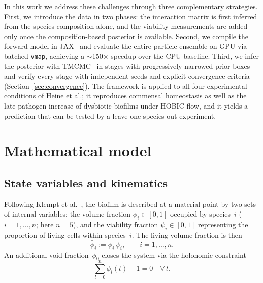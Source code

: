 \documentclass[11pt,a4paper]{article}
\begin{document}
In this work we address these challenges through three complementary strategies.
First, we introduce the data in two phases: the interaction matrix is first inferred from the species composition alone, and the viability measurements are added only once the composition-based posterior is available.
Second, we compile the forward model in JAX~\cite{jax2018github} and evaluate the entire particle ensemble on GPU via batched \texttt{vmap}, achieving a $\sim$150$\times$ speedup over the CPU baseline.
Third, we infer the posterior with TMCMC~\cite{ChingChen2007TMCMC, Betz2016TMCMC} in stages with progressively narrowed prior boxes and verify every stage with independent seeds and explicit convergence criteria (Section~\ref{sec:convergence}).
The framework is applied to all four experimental conditions of Heine et al.; it reproduces commensal homeostasis as well as the late pathogen increase of dysbiotic biofilms under HOBIC flow, and it yields a prediction that can be tested by a leave-one-species-out experiment.

\section{Mathematical model}
\label{sec:model}

\subsection{State variables and kinematics}

Following Klempt et al.~\cite{Klempt2025ContinuumBiofilm, Klempt2024ContinuumGrowth}, the biofilm is described at a material point by two sets of internal variables: the volume fraction $\phi_i \in [0,1]$ occupied by species~$i$ ($i=1,\dots,n$; here $n=5$), and the viability fraction $\psi_i \in [0,1]$ representing the proportion of living cells within species~$i$.
The living volume fraction is then
\begin{equation}
\bar{\phi}_i := \phi_i\,\psi_i,
\qquad i=1,\dots,n.
\label{eq:living}
\end{equation}
An additional void fraction~$\phi_0$ closes the system via the holonomic constraint
\begin{equation}
\sum_{l=0}^{n}\phi_l(t) - 1 = 0 \quad\forall\,t.
\label{eq:constraint}
\end{equation}
\end{document}
